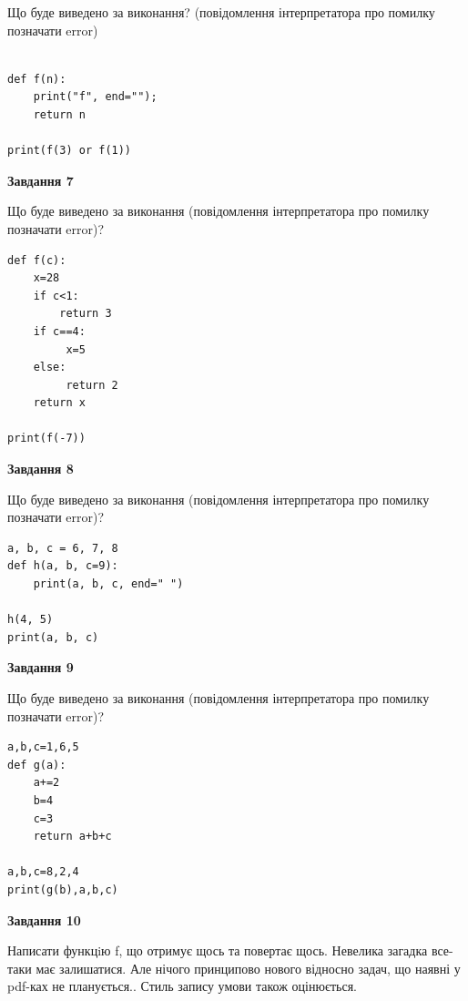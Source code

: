 \documentclass[12pt, ukrainian]{article}
\begin{document}
{\begin {large}
Що буде виведено за виконання? (повідомлення інтерпретатора про помилку позначати error)\par
\begin{verbatim}

def f(n):
    print("f", end="");
    return n

print(f(3) or f(1))
\end{verbatim}

{\begin {center}\textbf{Завдання 7}\end {center}}

Що буде виведено за виконання (повідомлення інтерпретатора про помилку позначати error)?\par
\begin{verbatim}
def f(c):
    x=28
    if c<1: 
        return 3
    if c==4:
         x=5
    else:
         return 2
    return x

print(f(-7))
\end{verbatim}

{\begin {center}\textbf{Завдання 8}\end {center}}

Що буде виведено за виконання (повідомлення інтерпретатора про помилку позначати error)?\par
\begin{verbatim}
a, b, c = 6, 7, 8
def h(a, b, c=9):
    print(a, b, c, end=" ")

h(4, 5)
print(a, b, c)
\end{verbatim}

{\begin {center}\textbf{Завдання 9}\end {center}}

Що буде виведено за виконання (повідомлення інтерпретатора про помилку позначати error)?\par
\begin{verbatim}
a,b,c=1,6,5
def g(a):
    a+=2
    b=4
    c=3
    return a+b+c

a,b,c=8,2,4
print(g(b),a,b,c)
\end{verbatim}

{\begin {center}\textbf{Завдання 10}\end {center}}


Написати функцiю f, що отримує щось та повертає щось. Невелика загадка все-таки має залишатися. Але нічого принципово нового відносно задач, що наявні у pdf-ках не планується.. Стиль запису умови також оцінюється.\par
\end {large}}
\newpage
\end{document}
